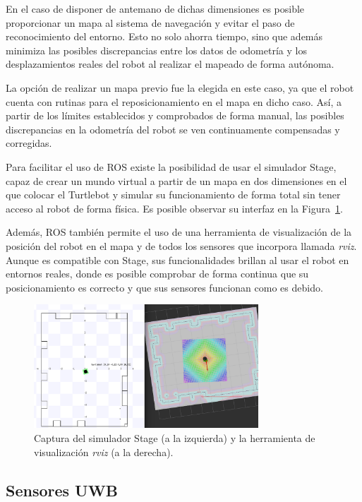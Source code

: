 En el caso de disponer de antemano de dichas dimensiones es posible proporcionar un mapa al sistema de navegación y evitar el paso de reconocimiento del entorno.
Esto no solo ahorra tiempo, sino que además minimiza las posibles discrepancias entre los datos de odometría y los desplazamientos reales del robot al realizar el mapeado de forma autónoma.

La opción de realizar un mapa previo fue la elegida en este caso, ya que el robot cuenta con rutinas para el reposicionamiento en el mapa en dicho caso.
Así, a partir de los límites establecidos y comprobados de forma manual, las posibles discrepancias en la odometría del robot se ven continuamente compensadas y corregidas.

Para facilitar el uso de ROS existe la posibilidad de usar el simulador Stage, capaz de crear un mundo virtual a partir de un mapa en dos dimensiones en el que colocar el Turtlebot y simular su funcionamiento de forma total sin tener acceso al robot de forma física.
Es posible observar su interfaz en la Figura~\ref{fig:stage_rviz}.

Además, ROS también permite el uso de una herramienta de visualización de la posición del robot en el mapa y de todos los sensores que incorpora llamada \textit{rviz}.
Aunque es compatible con Stage, sus funcionalidades brillan al usar el robot en entornos reales, donde es posible comprobar de forma continua que su posicionamiento es correcto y que sus sensores funcionan como es debido.

\begin{figure}[H]
    \centering
    \includegraphics[width=0.75\textwidth]{pic/Stage-rviz.png}
    \caption{Captura del simulador Stage (a la izquierda) y la herramienta de visualización \textit{rviz} (a la derecha).}
    \label{fig:stage_rviz}
\end{figure}

\subsection{Sensores UWB}

